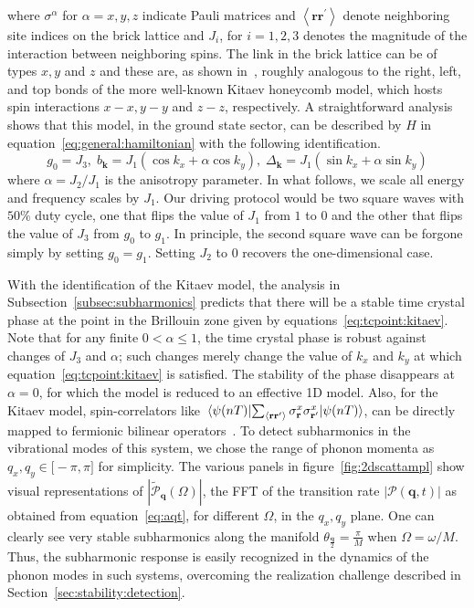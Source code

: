 \documentclass[preprint,5p,times,twocolumn]{elsarticle}
\newcommand{\bmk}{\bm{k}}
\newcommand{\bmq}{\bm{q}}
\begin{document}
where $\sigma^{\alpha}$ for $\alpha=x, y, z$ indicate Pauli matrices and $\left\langle\mathbf{r r}^{\prime}\right\rangle$ denote neighboring site indices on the brick lattice and $J_{i}$, for $i=1,2,3$ denotes the magnitude of the interaction between neighboring spins. The link in the brick lattice can be of types $x, y$ and $z$ and these are, as shown in~\citep{Chen_2008}, roughly analogous to the right, left, and top bonds of the more well-known Kitaev honeycomb model, which hosts spin interactions $x-x, y-y$ and $z-z$, respectively. A straightforward analysis shows that this model, in the ground state sector, can be described by $H$ in equation~\ref{eq:general:hamiltonian} with the following identification.
\begin{equation}
    g_{0}=J_{3}, \; b_{\bmk}=J_{1}\left(\cos k_{x}+\alpha \cos k_{y}\right), \; \Delta_{\bmk}=J_{1}\left(\sin k_{x}+\alpha \sin k_{y}\right)
    \label{eq:kitaev:tck}
\end{equation}
where $\alpha=J_{2} / J_{1}$ is the anisotropy parameter. In what follows, we scale all energy and frequency scales by $J_{1}$. Our driving protocol would be two square waves with $50\%$ duty cycle, one that flips the value of $J_1$ from $1$ to $0$ and the other that flips the value of $J_3$ from $g_0$ to $g_1$. In principle, the second square wave can be forgone simply by setting $g_0=g_1$. Setting $J_2$ to $0$ recovers the one-dimensional case.

With the identification of the Kitaev model, the analysis in Subsection~\ref{subsec:subharmonics} predicts that there will be a stable time crystal phase at the point in the Brillouin zone given by equations~\ref{eq:tcpoint:kitaev}. Note that for any finite $0<\alpha\leq 1$, the time crystal phase is robust against changes of $J_{3}$ and $\alpha$; such changes merely change the value of $k_{x}$ and $k_{y}$ at which equation~\ref{eq:tcpoint:kitaev} is satisfied. The stability of the phase disappears at $\alpha=0$, for which the model is reduced to an effective 1D model. Also, for the Kitaev model, spin-correlators like $\mel{\psi(nT)}{\sum_{\left\langle\mathbf{r r}^{\prime}\right\rangle} \sigma_{\mathbf{r}}^{x} \sigma_{\mathbf{r}^{\prime}}^{x}}{\psi(nT)}$,  can be directly mapped to fermionic bilinear operators~\citep{Chen_2008}. To detect subharmonics in the vibrational modes of this system, we chose the range of phonon momenta as $q_x, q_y\in \big[-\pi, \pi\big]$ for simplicity. The various panels in figure~\ref{fig:2dscattampl} show visual representations of $|\widetilde{\mathcal{P}}_{\bmq}(\Omega)|$, the FFT of the transition rate $|\mathcal{P}(\bmq, t)|$ as obtained from equation~\ref{eq:aqt}, for different $\Omega$, in the $q_x, q_y$ plane. One can clearly see very stable subharmonics along the manifold $\theta_{\frac{\bm{q}}{2}}=\displaystyle\frac{\pi}{M}$ when $\Omega=\omega/M$. Thus, the subharmonic response is easily recognized in the dynamics of the phonon modes in such systems, overcoming the realization challenge described in Section~\ref{sec:stability:detection}.
\end{document}
